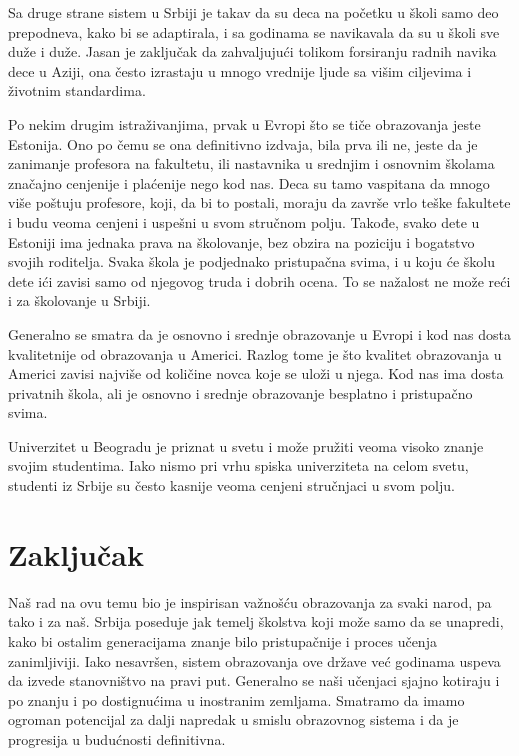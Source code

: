 \documentclass[a4paper]{article}
\begin{document}
Sa druge strane sistem u Srbiji je takav da su deca na početku u školi samo deo prepodneva, kako bi se adaptirala, i sa godinama se navikavala da su u školi sve duže i duže. Jasan je zaključak da zahvaljujući tolikom forsiranju radnih navika dece u Aziji, ona često izrastaju u mnogo vrednije ljude sa višim ciljevima i životnim standardima. 
 
Po nekim drugim istraživanjima, prvak u Evropi što se tiče obrazovanja jeste Estonija. Ono po čemu se ona definitivno izdvaja, bila prva ili ne, jeste da je zanimanje profesora na fakultetu, ili nastavnika u srednjim i osnovnim školama značajno cenjenije i plaćenije nego kod nas. Deca su tamo vaspitana da mnogo više poštuju profesore, koji, da bi to postali, moraju da završe vrlo teške fakultete  i budu veoma cenjeni i uspešni u svom stručnom polju. Takođe, svako dete u Estoniji ima jednaka prava na školovanje, bez obzira na poziciju i bogatstvo svojih roditelja. Svaka škola je podjednako pristupačna svima, i u koju će školu dete ići zavisi samo od njegovog truda i dobrih ocena. To se nažalost ne može reći i za školovanje u Srbiji.


Generalno se smatra da je osnovno i srednje obrazovanje u Evropi i kod nas dosta kvalitetnije od obrazovanja u Americi. Razlog tome je što kvalitet obrazovanja u Americi zavisi najviše od količine novca koje se uloži u njega. Kod nas ima dosta privatnih škola, ali je osnovno i srednje obrazovanje besplatno i pristupačno svima.

Univerzitet u Beogradu je priznat u svetu i može pružiti veoma visoko znanje svojim studentima. Iako nismo pri vrhu spiska univerziteta na celom svetu, studenti iz Srbije su često kasnije veoma cenjeni stručnjaci u svom polju.
\label{sec:Srbija}
\newpage
\section{Zaključak}
\label{sec:Zaključak}
Naš rad na ovu temu bio je inspirisan važnošću obrazovanja za svaki narod, pa tako i za naš. Srbija poseduje jak temelj školstva koji može samo da se unapredi, kako bi ostalim generacijama znanje bilo pristupačnije i proces učenja zanimljiviji. Iako nesavršen, sistem obrazovanja ove države već godinama uspeva da izvede stanovništvo na pravi put. Generalno se naši učenjaci sjajno kotiraju i po znanju i po dostignućima u inostranim zemljama. Smatramo da imamo ogroman potencijal za dalji napredak u smislu obrazovnog sistema i da je progresija u budućnosti definitivna.
\appendix
\end{document}
